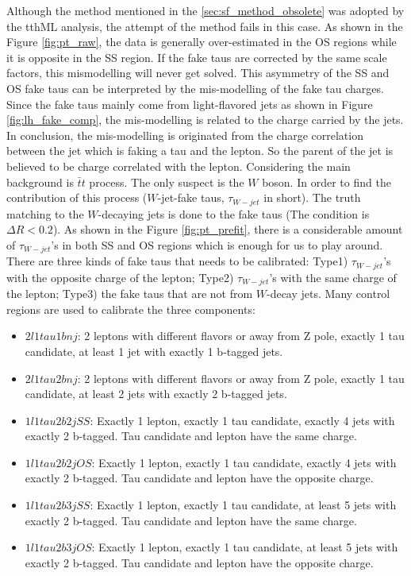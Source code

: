 Although the method mentioned in the \ref{sec:sf_method_obsolete} was adopted by the tthML analysis, the attempt of the method fails in this case. As shown in the Figure \ref{fig:pt_raw}, the data is generally over-estimated in the OS regions while it is opposite in the SS region. If the fake taus are corrected by the same scale factors, this mismodelling will never get solved. This asymmetry of the SS and OS fake taus can be interpreted by the mis-modelling of the fake tau charges. Since the fake taus mainly come from light-flavored jets as shown in Figure \ref{fig:lh_fake_comp}, the mis-modelling is related to the charge carried by the jets. In conclusion, the mis-modelling is originated from the charge correlation between the jet which is faking a tau and the lepton. So the parent of the jet is believed to be charge correlated with the lepton. Considering the main background is $\bar{t}t$ process. The only suspect is the $W$ boson. In order to find the contribution of this process ($W$-jet-fake taus, $\tau_{W-jet}$ in short). The truth matching to the $W$-decaying jets is done to the fake taus (The condition is $\Delta R < 0.2$). As shown in the Figure \ref{fig:pt_prefit}, there is a considerable amount of $\tau_{W-jet}$'s in both SS and OS regions which is enough for us to play around. There are three kinds of fake taus that needs to be calibrated: Type1) $\tau_{W-jet}$'s with the opposite charge of the lepton; Type2) $\tau_{W-jet}$'s with the same charge of the lepton; Type3) the fake taus that are not from $W$-decay jets. Many control regions are used to calibrate the three components:

\begin{itemize}
\item{$2l1tau1bnj$: 2 leptons with different flavors or away from Z pole, exactly 1 tau candidate, at least 1 jet with exactly 1 b-tagged jets.}
\item{$2l1tau2bnj$: 2 leptons with different flavors or away from Z pole, exactly 1 tau candidate, at least 2 jets with exactly 2 b-tagged jets.}
\item{$1l1tau2b2j SS$: Exactly 1 lepton, exactly 1 tau candidate, exactly 4 jets with exactly 2 b-tagged. Tau candidate and lepton have the same charge.}
\item{$1l1tau2b2j OS$: Exactly 1 lepton, exactly 1 tau candidate, exactly 4 jets with exactly 2 b-tagged. Tau candidate and lepton have the opposite charge.}
\item{$1l1tau2b3j SS$: Exactly 1 lepton, exactly 1 tau candidate, at least 5 jets with exactly 2 b-tagged. Tau candidate and lepton have the same charge.}
\item{$1l1tau2b3j OS$: Exactly 1 lepton, exactly 1 tau candidate, at least 5 jets with exactly 2 b-tagged. Tau candidate and lepton have the opposite charge.}
\end{itemize}


